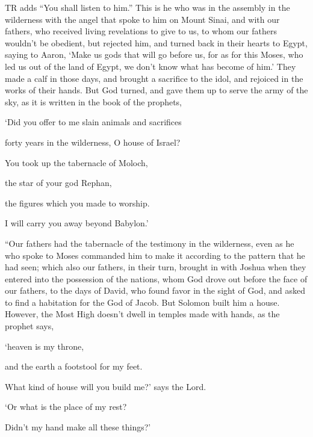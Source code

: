 {{TR adds “You shall listen to him.”}
This is he who was in the assembly in the wilderness with the angel that spoke to him on Mount Sinai, and with our fathers, who received living revelations to give to us,
to whom our fathers wouldn’t be obedient, but rejected him, and turned back in their hearts to Egypt,
saying to Aaron, ‘Make us gods that will go before us, for as for this Moses, who led us out of the land of Egypt, we don’t know what has become of him.’
They made a calf in those days, and brought a sacrifice to the idol, and rejoiced in the works of their hands.
But God turned, and gave them up to serve the army of the sky, as it is written in the book of the prophets,
\par }{\Q ‘Did you offer to me slain animals and sacrifices
\par }{\QB forty years in the wilderness, O house of Israel?
\par }{\Q {}You took up the tabernacle of Moloch,
\par }{\QB the star of your god Rephan,
\par }{\Q the figures which you made to worship.
\par }{\QB I will carry you away beyond Babylon.’
\par }{\PP {}“Our fathers had the tabernacle of the testimony in the wilderness, even as he who spoke to Moses commanded him to make it according to the pattern that he had seen;
which also our fathers, in their turn, brought in with Joshua when they entered into the possession of the nations, whom God drove out before the face of our fathers, to the days of David,
who found favor in the sight of God, and asked to find a habitation for the God of Jacob.
But Solomon built him a house.
However, the Most High doesn’t dwell in temples made with hands, as the prophet says,
\par }{\Q {}‘heaven is my throne,
\par }{\QB and the earth a footstool for my feet.
\par }{\Q What kind of house will you build me?’ says the Lord.
\par }{\QB ‘Or what is the place of my rest?
\par }{\Q {}Didn’t my hand make all these things?’}
